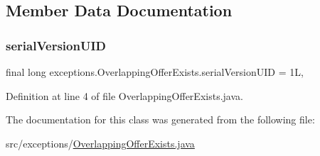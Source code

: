 \begin{DoxyCode}{0}

\end{DoxyCode}


\subsection{Member Data Documentation}
\mbox{\label{classexceptions_1_1OverlappingOfferExists_ab47bd08f41ac7a43204806e53aa1538a}} 
\subsubsection{\texorpdfstring{serialVersionUID}{serialVersionUID}}
{\footnotesize\ttfamily final long exceptions.\+Overlapping\+Offer\+Exists.\+serial\+Version\+U\+ID = 1L\hspace{0.3cm}{\ttfamily [static]}, {\ttfamily [private]}}



Definition at line 4 of file Overlapping\+Offer\+Exists.\+java.



The documentation for this class was generated from the following file\+:\begin{DoxyCompactItemize}
\item 
src/exceptions/\mbox{\hyperlink{OverlappingOfferExists_8java}{Overlapping\+Offer\+Exists.\+java}}\end{DoxyCompactItemize}
